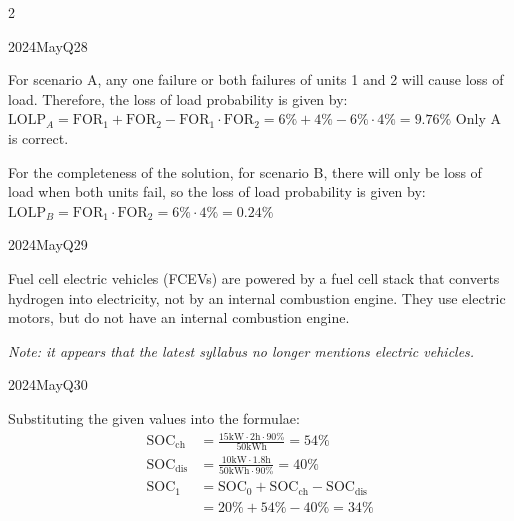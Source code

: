 \begin{multicols}{2}
\begin{qsolution}{2024}{May}{Q28}{\tgEE \tgEEPowerSystems}

    For scenario A, any one failure or both failures of units 1 and 2 will cause loss of load.
    Therefore, the loss of load probability is given by:
    $
        \mathrm{LOLP}_A = \mathrm{FOR}_1 + \mathrm{FOR}_2 - \mathrm{FOR}_1 \cdot \mathrm{FOR}_2
        = 6\% + 4\% - 6\% \cdot 4\% = 9.76\%
    $
    Only A is correct.

    For the completeness of the solution, for scenario B, there will only be loss of load when both units fail, so the loss of load probability is given by:
    $
        \mathrm{LOLP}_B = \mathrm{FOR}_1 \cdot \mathrm{FOR}_2 = 6\% \cdot 4\% = 0.24\%
    $
\end{qsolution}

\begin{qsolution}[20]{2024}{May}{Q29}{\tgEE \tgEERenewableEnergy \tgOutSyl}

    Fuel cell electric vehicles (FCEVs) are powered by a fuel cell stack that converts hydrogen into electricity, not by an internal combustion engine.
    They use electric motors, but do not have an internal combustion engine.

    \itshape Note: it appears that the latest syllabus no longer mentions electric vehicles.
\end{qsolution}

\begin{qsolution}[20]{2024}{May}{Q30}{\tgEE \tgEEBatterySOC}

    Substituting the given values into the formulae:
    \begin{align*}
        \mathrm{SOC}_{\mathrm{ch}}&=\frac{15\mathrm{kW}\cdot2\mathrm{h}\cdot90\%}{50\mathrm{kWh}}=54\%\\
        \mathrm{SOC}_{\mathrm{dis}}&=\frac{10\mathrm{kW}\cdot1.8\mathrm{h}}{50\mathrm{kWh}\cdot90\%}=40\%\\
        \mathrm{SOC}_1&=\mathrm{SOC}_0+\mathrm{SOC}_{\mathrm{ch}}-\mathrm{SOC}_{\mathrm{dis}}\\
        &=20\%+54\%-40\%=\boxed{34\%}
    \end{align*}
\end{qsolution}

\end{multicols}

